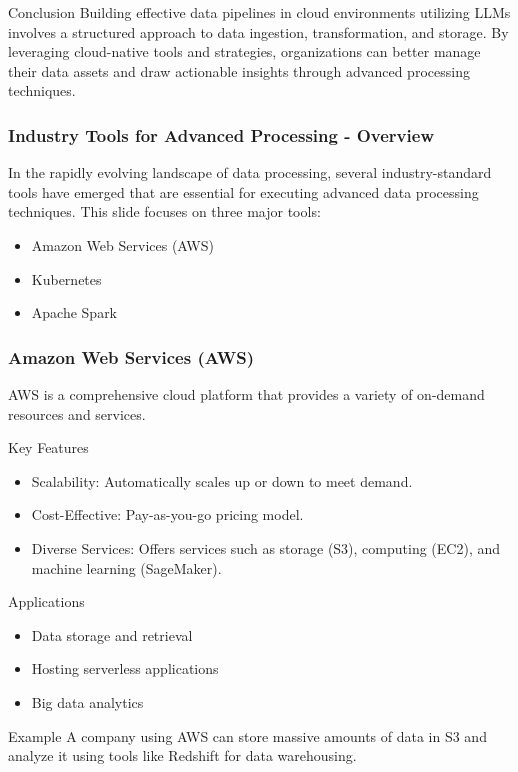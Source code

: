 \documentclass[aspectratio=169]{beamer}
\begin{document}
\begin{frame}{Conclusion}
    Building effective data pipelines in cloud environments utilizing LLMs involves a structured approach to data ingestion, transformation, and storage. By leveraging cloud-native tools and strategies, organizations can better manage their data assets and draw actionable insights through advanced processing techniques.
\end{frame}

\begin{frame}[fragile]
    \frametitle{Industry Tools for Advanced Processing - Overview}
    In the rapidly evolving landscape of data processing, several industry-standard tools have emerged that are essential for executing advanced data processing techniques. This slide focuses on three major tools:
    
    \begin{itemize}
        \item Amazon Web Services (AWS)
        \item Kubernetes
        \item Apache Spark
    \end{itemize}
\end{frame}

\begin{frame}[fragile]
    \frametitle{Amazon Web Services (AWS)}
    AWS is a comprehensive cloud platform that provides a variety of on-demand resources and services.

    \begin{block}{Key Features}
        \begin{itemize}
            \item Scalability: Automatically scales up or down to meet demand.
            \item Cost-Effective: Pay-as-you-go pricing model.
            \item Diverse Services: Offers services such as storage (S3), computing (EC2), and machine learning (SageMaker).
        \end{itemize}
    \end{block}
    
    \begin{block}{Applications}
        \begin{itemize}
            \item Data storage and retrieval
            \item Hosting serverless applications
            \item Big data analytics
        \end{itemize}
    \end{block}

    \begin{block}{Example}
        A company using AWS can store massive amounts of data in S3 and analyze it using tools like Redshift for data warehousing.
    \end{block}
\end{frame}
\end{document}
